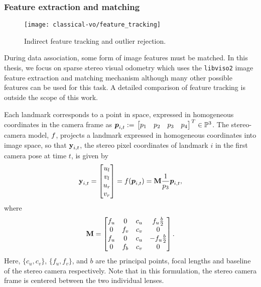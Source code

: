 \subsubsection{Feature extraction and matching}

\begin{figure}[h!]
\begin{center}
		\texttt{[image: classical-vo/feature\_tracking]}
		\caption{Indirect feature tracking and outlier rejection.}
  	\label{fig:vo_feature_tracking}
\end{center}
\end{figure}

During data association, some form of image features must be matched. In this thesis, we focus on sparse stereo visual odometry which uses the \texttt{libviso2} \citep{geiger2011stereoscan} image feature extraction and matching mechanism although many other possible features can be used for this task. A detailed comparison of feature tracking is outside the scope of this work.

Each landmark corresponds to a
point in space, expressed in homogeneous coordinates in the camera frame as
$\HomogeneousPoint{i}{t} := \Transpose{\bbm p_1 & p_2 & p_3 & p_4 \ebm} \in
\HomogeneousNumbers[3]$.  The stereo-camera model, $f$,
projects a landmark expressed in homogeneous coordinates into image space, so
that $\boldsymbol{\mathbf{y}}_{i,t}$, the stereo pixel coordinates of landmark $i$ in the first camera pose at time $t$, is given
by 
\begin{equation}
	\boldsymbol{\mathbf{y}}_{i,t} = \begin{bmatrix} u_l \\ v_l \\ u_r \\ v_r \end{bmatrix} 
  = f(\boldsymbol{p}_{i,t}) 
  = \boldsymbol{\mathbf{M}} \frac{1}{p_3}\boldsymbol{p}_{i,t},
\end{equation}
where
\begin{equation}
 \boldsymbol{\mathbf{M}} = \begin{bmatrix} f_u & 0 & c_u & f_u \frac{b}{2} \\ 0 & f_v & c_v & 0 \\ f_u 
                        & 0 & c_u & -f_u\frac{b}{2} \\ 0 & f_b & c_v & 0 \end{bmatrix}.
\end{equation}
Here, $\{c_u, c_v\}$, $\{f_u, f_v\}$, and $b$ are the principal points, focal
lengths and baseline of the stereo camera respectively. Note that in this
formulation, the stereo camera frame is centered between the two individual
lenses.  


